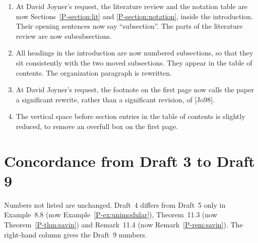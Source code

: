 \documentclass[12pt,letterpaper]{amsart}
\begin{document}
\begin{enumerate}[leftmargin=1.5em]
\item At David Joyner's request, the literature review and the notation
table are now Sections~\ref{P-section:lit} and \ref{P-section:notation},
inside the introduction. Their opening sentences now say
``subsection''. The parts of the literature review are now
subsubsections.
\item All headings in the introduction are now numbered subsections, so
that they sit consistently with the two moved subsections. They appear
in the table of contents. The organization paragraph is rewritten.
\item At David Joyner's request, the footnote on the first page now
calls the paper a significant rewrite, rather than a significant
revision, of [Jo98].
\item The vertical space before section entries in the table of
contents is slightly reduced, to remove an overfull box on the first
page.
\end{enumerate}

\section{Concordance from Draft 3 to Draft 9}
\label{sec:conc34}

Numbers not listed are unchanged. Draft~4 differs from Draft~5 only
in Example~8.8 (now Example~\ref{P-ex:unimodular}), Theorem~11.3 (now
Theorem~\ref{P-thm:savin}) and Remark~11.4 (now
Remark~\ref{P-rem:savin}). The right-hand column gives the Draft~9
numbers.
\end{document}
